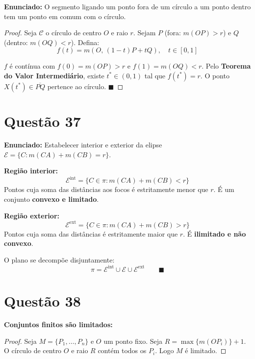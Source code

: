\documentclass[12pt,a4paper]{article}
\begin{document}
\textbf{Enunciado:} O segmento ligando um ponto fora de um c\'irculo a um ponto dentro tem um ponto em comum com o c\'irculo.

\begin{proof}
Seja $\mathcal{C}$ o c\'irculo de centro $O$ e raio $r$. Sejam $P$ (fora: $m(OP) > r$) e $Q$ (dentro: $m(OQ) < r$). Defina:
$$f(t) = m(O,\, (1-t)P + tQ), \quad t \in [0,1]$$

$f$ \'e cont\'inua com $f(0) = m(OP) > r$ e $f(1) = m(OQ) < r$. Pelo \textbf{Teorema do Valor Intermedi\'ario}, existe $t^* \in (0,1)$ tal que $f(t^*) = r$. O ponto $X(t^*) \in \overline{PQ}$ pertence ao c\'irculo. $\blacksquare$
\end{proof}

\section*{Quest\~ao 37}

\textbf{Enunciado:} Estabelecer interior e exterior da elipse $\mathcal{E} = \{C : m(CA) + m(CB) = r\}$.

\textbf{Regi\~ao interior:}
$$\mathcal{E}^{\mathrm{int}} = \{C \in \pi : m(CA) + m(CB) < r\}$$
Pontos cuja soma das dist\^ancias aos focos \'e estritamente menor que $r$. \'E um conjunto \textbf{convexo e limitado}.

\textbf{Regi\~ao exterior:}
$$\mathcal{E}^{\mathrm{ext}} = \{C \in \pi : m(CA) + m(CB) > r\}$$
Pontos cuja soma das dist\^ancias \'e estritamente maior que $r$. \'E \textbf{ilimitado e n\~ao convexo}.

O plano se decomp\~oe disjuntamente:
$$\pi = \mathcal{E}^{\mathrm{int}} \cup \mathcal{E} \cup \mathcal{E}^{\mathrm{ext}} \qquad \blacksquare$$

\section*{Quest\~ao 38}

\textbf{Conjuntos finitos s\~ao limitados:}

\begin{proof}
Seja $M = \{P_1, \ldots, P_n\}$ e $O$ um ponto fixo. Seja $R = \max\{m(OP_i)\} + 1$. O c\'irculo de centro $O$ e raio $R$ cont\'em todos os $P_i$. Logo $M$ \'e limitado.
\end{proof}
\end{document}
